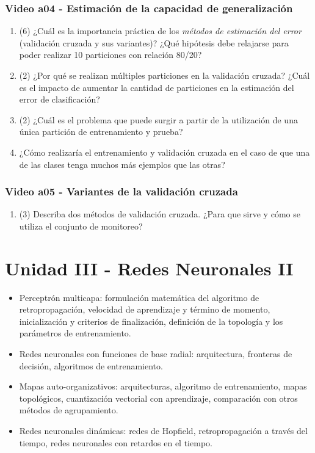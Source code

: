 \documentclass[a4paper,10pt,spanish,oneside]{article}
\begin{document}
\subsubsection{Video a04 - Estimación de la capacidad de generalización}

\begin{enumerate}
\item (6) ¿Cuál es la importancia práctica de los \textit{métodos de estimación del error} (validación cruzada y sus variantes)? ¿Qué hipótesis debe relajarse para poder realizar 10 particiones con relación 80/20?

\item (2) ¿Por qué se realizan múltiples particiones en la validación cruzada? ¿Cuál es el impacto de aumentar la cantidad de particiones en la estimación del error de clasificación?

\item (2) ¿Cuál es el problema que puede surgir a partir de la utilización de una única partición de entrenamiento y prueba?

\item ¿Cómo realizaría el entrenamiento y validación cruzada en el caso de que una de las clases tenga muchos más ejemplos que las otras?
\end{enumerate}

\subsubsection{Video a05 - Variantes de la validación cruzada}

\begin{enumerate}
\item (3) Describa dos métodos de validación cruzada. ¿Para que sirve y cómo se utiliza el conjunto de monitoreo?
\end{enumerate}

\newpage

\section{Unidad III - Redes Neuronales II}

\begin{itemize}
\item Perceptrón multicapa: formulación matemática del algoritmo de retropropagación, velocidad de aprendizaje y término de momento, inicialización y criterios de finalización, definición de la topología y los parámetros de entrenamiento.
\item Redes neuronales con funciones de base radial: arquitectura, fronteras de decisión, algoritmos de entrenamiento.
\item Mapas auto-organizativos: arquitecturas, algoritmo de entrenamiento, mapas topológicos, cuantización vectorial con aprendizaje, comparación con otros métodos de agrupamiento.
\item Redes neuronales dinámicas: redes de Hopfield, retropropagación a través del tiempo, redes neuronales con retardos en el tiempo.
\end{itemize}
\end{document}

